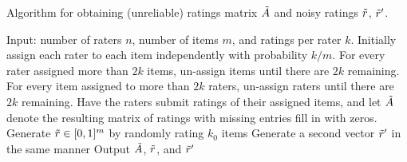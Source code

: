 \begin{algorithm}[t!]
\caption{Algorithm for obtaining (unreliable) ratings matrix $\tilde{A}$ and noisy 
ratings $\tilde{r}$, $\tilde{r}'$.}
\label{alg:create-A}
\begin{algorithmic}[1]
\State Input: number of raters $n$,  number of items $m$, and ratings per rater $k$.
\State Initially assign each rater to each item independently with probability $k/m$.  
\State For every rater assigned more than $2k$ items, un-assign items until 
       there are $2k$ remaining.
\State For every item assigned to more than $2k$
       raters, un-assign raters until there are $2k$ remaining.
\State Have the raters submit ratings of their assigned items, and let $\tilde{A}$ 
       denote the resulting matrix of ratings with missing entries fill in with 
       zeros.
\State Generate $\tilde{r} \in [0,1]^m$ by randomly rating $k_0$ items
\State Generate a second vector $\tilde{r}'$ in the same manner
\State Output $\tilde{A}$, $\tilde{r}$, and $\tilde{r}'$
\end{algorithmic}
\end{algorithm}


